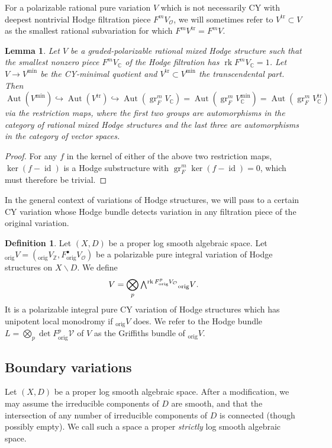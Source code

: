 \documentclass{amsart}
\newcommand{\bs}{\backslash}
\newcommand{\id}{\operatorname{id}}
\newtheorem{lem}[theorem]{Lemma}
\theoremstyle{definition}
\newtheorem{defn}[theorem]{Definition}
\theoremstyle{remark}
\def\bZ{\mathbb{Z}}
\def\bC{\mathbb{C}}
\def\cO{\mathcal{O}}
\def\cV{\mathcal{V}}
\def\gr{\operatorname{gr}}
\def\trans{\mathrm{tr}}
\def\mini{\mathrm{min}}
\def\orig{\mathrm{orig}}
\def\rk{\operatorname{rk}}
\def\Aut{\operatorname{Aut}}
\numberwithin{equation}{section}
\newcommand{\Exterior}{\mathchoice{{\textstyle\bigwedge}}%
    {{\bigwedge}}%
    {{\textstyle\wedge}}%
    {{\scriptstyle\wedge}}}
\begin{document}
For a polarizable rational pure variation $V$ which is not necessarily CY with deepest nontrivial Hodge filtration piece $F^mV_\cO$, we will sometimes refer to $V^\trans\subset V$ as the smallest rational subvariation for which $F^mV^\trans=F^m V$.




\begin{lem}\label{lem:inject autos}Let $V$ be a graded-polarizable rational mixed Hodge structure such that the smallest nonzero piece $F^mV_\bC$ of the Hodge filtration has $\rk F^m V_\bC=1$.  Let $V\to V^\mini$ be the CY-minimal quotient and $V^\trans\subset V^\mini$ the transcendental part.  Then
\[\Aut(V^\mini)\hookrightarrow \Aut(V^\trans) \hookrightarrow \Aut(\gr_F^m V_\bC)=\Aut(\gr_F^m V_\bC^\mini)=\Aut(\gr_F^m V_\bC^\trans)\]
via the restriction maps, where the first two groups are automorphisms in the category of rational mixed Hodge structures and the last three are automorphisms in the category of vector spaces.
\end{lem}
\begin{proof}For any $f$ in the kernel of either of the above two restriction maps, $\ker(f-\id)$ is a Hodge substructure with $\gr_F^m\ker(f-\id)=0$, which must therefore be trivial.
\end{proof}

In the general context of variations of Hodge structures, we will pass to a certain CY variation whose Hodge bundle detects variation in any filtration piece of the original variation.
\begin{defn}\label{defn:griffiths wedge}Let $(X,D)$ be a proper log smooth algebraic space.  Let $_\orig V=(_\orig V_\bZ,F^\bullet _\orig V_\cO)$ be a polarizable pure integral variation of Hodge structures on $X\bs D$.  We define
\[V=\bigotimes_p\Exterior^{\rk F^p_\orig V_\cO}{_\orig V}.\]
It is a polarizable integral pure CY variation of Hodge structures which has unipotent local monodromy if $_\orig V$ does.  We refer to the Hodge bundle $L=\bigotimes_p\det F^p_\orig \cV$ of $V$ as the Griffiths bundle of $_\orig V$.

\end{defn}


\subsection{Boundary variations}\label{subsect:boundary data}
Let $(X,D)$ be a proper log smooth algebraic space.  After a modification, we may assume the irreducible components of $D$ are smooth, and that the intersection of any number of irreducible components of $D$ is connected (though possibly empty). We call such a space a proper \textit{strictly} log smooth algebraic space.
\end{document}
